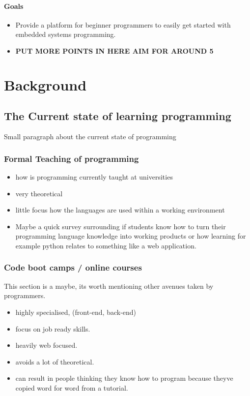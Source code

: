 \documentclass{l4proj}
\begin{document}
\subsubsection{Goals}
\begin{itemize}
    \item Provide a platform for beginner programmers to easily get started with embedded systems programming.
    \item \textbf{PUT MORE POINTS IN HERE AIM FOR AROUND 5}
\end{itemize}



\chapter{Background}

\section{The Current state of learning programming}
Small paragraph about the current state of programming
\subsection{Formal Teaching of programming}
\begin{itemize}
    \item how is programming currently taught at universities
    \item very theoretical
    \item little focus how the languages are used within a working environment
    \item Maybe a quick survey surrounding if students know how to turn their programming language knowledge into working products or how learning for example python relates to something like a web application.
\end{itemize}


\subsection{Code boot camps / online courses}
This section is a maybe, its worth mentioning other avenues taken by programmers.
\begin{itemize}
    \item highly specialised, (front-end, back-end) 
    \item focus on job ready skills.
    \item heavily web focused.
    \item avoids a lot of theoretical.
    \item can result in people thinking they know how to program because theyve copied word for word from a tutorial.
\end{itemize}
\end{document}
